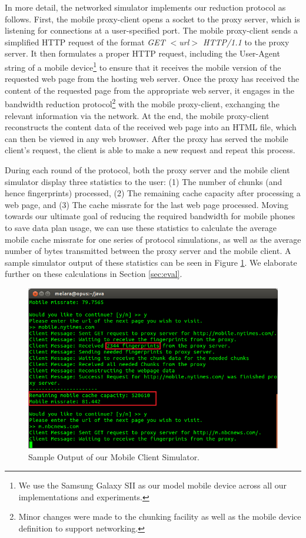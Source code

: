 In more detail, the networked simulator implements our reduction protocol as follows. First, the mobile proxy-client opens a socket to the proxy server, which is listening for connections at a user-specified port. The mobile proxy-client sends a simplified HTTP request of the format \emph{GET $<$url$>$ HTTP/1.1} to the proxy server. It then formulates a proper HTTP request, including the User-Agent string of a mobile device\footnote{We use the Samsung Galaxy SII as our model mobile device across all our implementations and experiments.} to ensure that it receives the mobile version of the requested web page from the hosting web server. Once the proxy has received the content of the requested page from the appropriate web server, it engages in the bandwidth reduction protocol\footnote{Minor changes were made to the chunking facility as well as the mobile device definition to support networking.} with the mobile proxy-client, exchanging the relevant information via the network. At the end, the mobile proxy-client reconstructs the content data of the received web page into an HTML file, which can then be viewed in any web browser. After the proxy has served the mobile client's request, the client is able to make a new request and repeat this process.

During each round of the protocol, both the proxy server and the mobile client simulator display three statistics to the user: (1) The number of chunks (and hence fingerprints) processed, (2) The remaining cache capacity after processing a web page, and (3) The cache missrate for the last web page processed. Moving towards our ultimate goal of reducing the required bandwidth for mobile phones to save data plan usage, we can use these statistics to calculate the average mobile cache missrate for one series of protocol simulations, as well as the average number of bytes transmitted between the proxy server and the mobile client. A sample simulator output of these statistics can be seen in Figure \ref{fig:mobsim_output}. We elaborate further on these calculations in Section \ref{sec:eval}.

\begin{figure}[h] 
\centering \includegraphics[scale=0.40]{images/mobilesim_output.png}
\caption{Sample Output of our Mobile Client Simulator.}
\label{fig:mobsim_output}
\end{figure}

